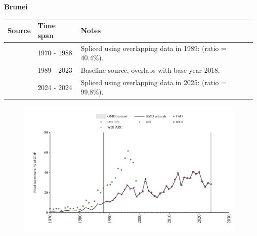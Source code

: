 \documentclass[12pt,a4paper,landscape]{article}
\begin{document}
\begin{adjustbox}{max totalsize={\paperwidth}{\paperheight},center}
\begin{minipage}[t][\textheight][t]{\textwidth}
\vspace*{0.5cm}
{}
\begin{center}
{\Large\bfseries Brunei}
\end{center}
\vspace{0.5cm}
\begin{table}[H]
\centering
\small
\begin{tabular}{|l|l|l|}
\hline
\textbf{Source} & \textbf{Time span} & \textbf{Notes} \\
\hline
\rowcolor{white}\cite{UN}& 1970 - 1988 &Spliced using overlapping data in 1989: (ratio = 40.4\%).\\
\rowcolor{lightgray}\cite{WDI}& 1989 - 2023 &Baseline source, overlaps with base year 2018.\\
\rowcolor{white}\cite{IMF_IFS}& 2024 - 2024 &Spliced using overlapping data in 2025: (ratio = 99.8\%).\\
\hline
\end{tabular}
\end{table}
\begin{figure}[H]
\centering
\includegraphics[width=\textwidth,height=0.6\textheight,keepaspectratio]{graphs/BRN_finv_GDP.pdf}
\end{figure}
\end{minipage}
\end{adjustbox}
\end{document}
